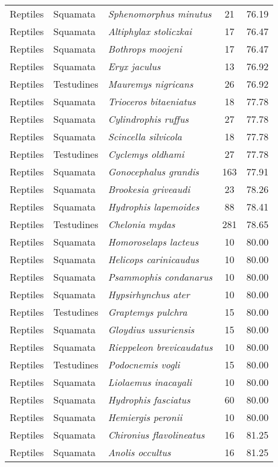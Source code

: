 \begin{longtable}{ll>{\itshape}lcc}
  Reptiles & Squamata & Sphenomorphus minutus &  21 & 76.19 \\ 
  Reptiles & Squamata & Altiphylax stoliczkai &  17 & 76.47 \\ 
  Reptiles & Squamata & Bothrops moojeni &  17 & 76.47 \\ 
  Reptiles & Squamata & Eryx jaculus &  13 & 76.92 \\ 
  Reptiles & Testudines & Mauremys nigricans &  26 & 76.92 \\ 
  Reptiles & Squamata & Trioceros bitaeniatus &  18 & 77.78 \\ 
  Reptiles & Squamata & Cylindrophis ruffus &  27 & 77.78 \\ 
  Reptiles & Squamata & Scincella silvicola &  18 & 77.78 \\ 
  Reptiles & Testudines & Cyclemys oldhami &  27 & 77.78 \\ 
  Reptiles & Squamata & Gonocephalus grandis & 163 & 77.91 \\ 
  Reptiles & Squamata & Brookesia griveaudi &  23 & 78.26 \\ 
  Reptiles & Squamata & Hydrophis lapemoides &  88 & 78.41 \\ 
  Reptiles & Testudines & Chelonia mydas & 281 & 78.65 \\ 
  Reptiles & Squamata & Homoroselaps lacteus &  10 & 80.00 \\ 
  Reptiles & Squamata & Helicops carinicaudus &  10 & 80.00 \\ 
  Reptiles & Squamata & Psammophis condanarus &  10 & 80.00 \\ 
  Reptiles & Squamata & Hypsirhynchus ater &  10 & 80.00 \\ 
  Reptiles & Testudines & Graptemys pulchra &  15 & 80.00 \\ 
  Reptiles & Squamata & Gloydius ussuriensis &  15 & 80.00 \\ 
  Reptiles & Squamata & Rieppeleon brevicaudatus &  10 & 80.00 \\ 
  Reptiles & Testudines & Podocnemis vogli &  15 & 80.00 \\ 
  Reptiles & Squamata & Liolaemus inacayali &  10 & 80.00 \\ 
  Reptiles & Squamata & Hydrophis fasciatus &  60 & 80.00 \\ 
  Reptiles & Squamata & Hemiergis peronii &  10 & 80.00 \\ 
  Reptiles & Squamata & Chironius flavolineatus &  16 & 81.25 \\ 
  Reptiles & Squamata & Anolis occultus &  16 & 81.25 \\ 

\end{longtable}
